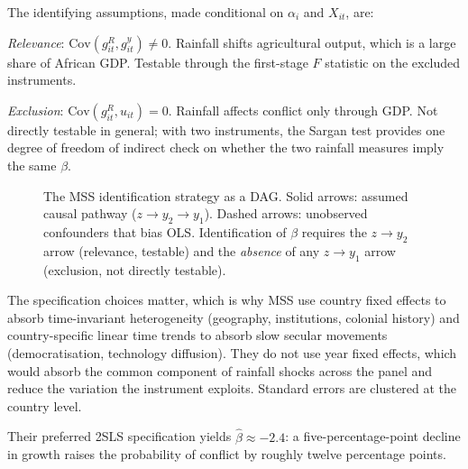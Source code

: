 \documentclass[11pt,a4paper]{article}
\begin{document}
The identifying assumptions, made conditional on $\alpha_i$ and $X_{it}$, are:

\textit{Relevance}: $\mathrm{Cov}(g^{R}_{it}, g^{y}_{it}) \neq 0$. Rainfall shifts
agricultural output, which is a large share of African GDP. Testable through the
first-stage $F$ statistic on the excluded instruments.

\textit{Exclusion}: $\mathrm{Cov}(g^{R}_{it}, u_{it}) = 0$. Rainfall affects
conflict only through GDP. Not directly testable in general; with two
instruments, the Sargan test provides one degree of freedom of indirect check on
whether the two rainfall measures imply the same $\beta$.

\begin{figure}[H]
\centering
{}
\caption{The MSS identification strategy as a DAG. Solid arrows: assumed
causal pathway ($z \to y_2 \to y_1$). Dashed arrows: unobserved
confounders that bias OLS. Identification of $\beta$ requires the
$z \to y_2$ arrow (relevance, testable) and the \emph{absence} of any
$z \to y_1$ arrow (exclusion, not directly testable).}
\label{fig:dag-mss}
\end{figure}

The specification choices matter, which is why MSS use country fixed effects to absorb time-invariant heterogeneity (geography, institutions, colonial history) and
country-specific linear time trends to absorb slow secular movements
(democratisation, technology diffusion). They do not use year fixed effects,
which would absorb the common component of rainfall shocks across the panel
and reduce the variation the instrument exploits. Standard errors are clustered
at the country level.

Their preferred 2SLS specification yields $\hat\beta \approx -2.4$: a
five-percentage-point decline in growth raises the probability of conflict by
roughly twelve percentage points.
\end{document}
